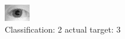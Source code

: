 \begin{figure}[h!]
\begin{center}
\includegraphics[width=0.60\columnwidth]{figures/ID1103_class_2_target_3.png}
\end{center}
\caption{ Classification: 2 actual target: 3}
\label{fig:ID1103_class_2_target_3}
\end{figure}
